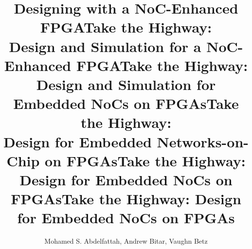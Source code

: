 \documentclass{sig-alternate}
\newcommand{\comment}[1]{}
\begin{document}
\newcommand{\figvsh}[4]{\begin{figure}[!h]
\centering
\texttt{[image: images/\#2]}
\caption{#4}
\label{#2}
\end{figure}}


\newcommand{\figfull}[4]{\begin{figure*}[!t]
\centering
\texttt{[image: images/\#2]}
\caption{#4}
\label{#2}
\end{figure*}}

\newcommand{\figp}[4]{\begin{figure}[#4]
\centering
\texttt{[image: images/\#1]}
\caption{#3}
\label{#1}
\end{figure}}

\newcommand{\subsubsubsection}[1]{\vspace{0.2cm}\noindent\textbf{\textit{#1:}}}




\title{Designing with a NoC-Enhanced FPGA} 
\title{Take the Highway:\\
Design and Simulation for a NoC-Enhanced FPGA} 
\title{Take the Highway:\\
Design and Simulation for Embedded NoCs on FPGAs} 
\title{Take the Highway:\\
Design for Embedded Networks-on-Chip on FPGAs} 
\title{Take the Highway:\\
Design for Embedded NoCs on FPGAs} 
\title{Take the Highway: Design for Embedded NoCs on FPGAs} 



%
\author{
\alignauthor
Mohamed S. Abdelfattah, Andrew Bitar, Vaughn Betz\\\vspace{.15cm}
       \\\vspace{.03cm}
       \\\vspace{.04cm}
}
\end{document}
